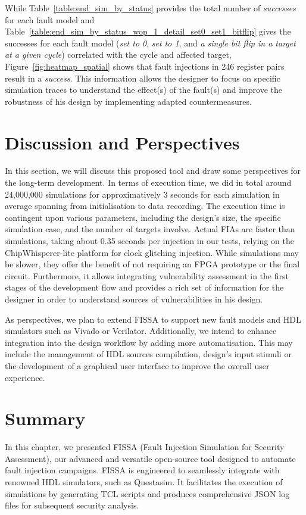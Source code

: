 While Table~\ref{table:end_sim_by_status} provides the total number of \textit{successes} for each fault model and Table~\ref{table:end_sim_by_status_wop_1_detail_set0_set1_bitflip} gives the successes for each fault model (\textit{set to 0}, \textit{set to 1}, and \textit{a single bit flip in a target at a given cycle}) correlated with the cycle and affected target, Figure~\ref{fig:heatmap_spatial} shows that fault injections in 246 register pairs result in a \textit{success}. This information allows the designer to focus on specific simulation traces to understand the effect(s) of the fault(s) and improve the robustness of his design by implementing adapted countermeasures.

\section{Discussion and Perspectives}

In this section, we will discuss this proposed tool and draw some perspectives for the long-term development.
In terms of execution time, we did in total around 24,000,000 simulations for approximatively 3 seconds for each simulation in average spanning from initialisation to data recording.
The execution time is contingent upon various parameters, including the design's size, the specific simulation case, and the number of targets involve.
Actual FIAs are faster than simulations, taking about 0.35 seconds per injection in our tests, relying on the ChipWhisperer-lite platform for clock glitching injection.
While simulations may be slower, they offer the benefit of not requiring an FPGA prototype or the final circuit. Furthermore, it allows integrating vulnerability assessment in the first stages of the development flow and provides a rich set of information for the designer in order to understand sources of vulnerabilities in his design.

As perspectives, we plan to extend FISSA to support new fault models and HDL simulators such as Vivado or Verilator.
Additionally, we intend to enhance integration into the design workflow by adding more automatisation. This may include the management of HDL sources compilation, design's input stimuli or the development of a graphical user interface to improve the overall user experience.
\section{Summary}
In this chapter, we presented FISSA (Fault Injection Simulation for Security Assessment), our advanced and versatile open-source tool designed to automate fault injection campaigns. FISSA is engineered to seamlessly integrate with renowned HDL simulators, such as Questasim. It facilitates the execution of simulations by generating TCL scripts and produces comprehensive JSON log files for subsequent security analysis.

